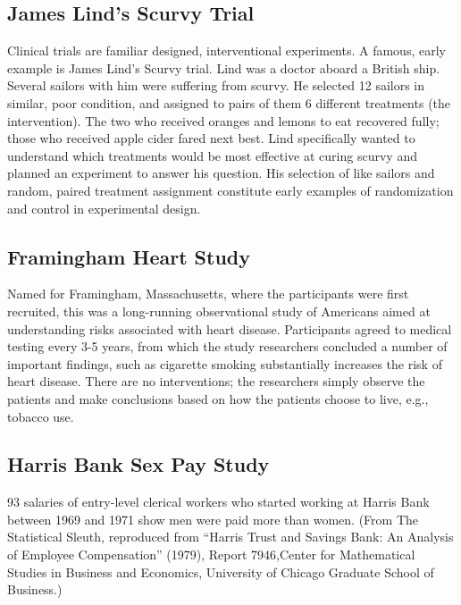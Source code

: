 \documentclass[
]{book}
\theoremstyle{definition}
\theoremstyle{definition}
\theoremstyle{definition}
\theoremstyle{definition}
\theoremstyle{remark}
\begin{document}
\hypertarget{james-linds-scurvy-trial}{%
\subsection{James Lind's Scurvy Trial}\label{james-linds-scurvy-trial}}

Clinical trials are familiar designed, interventional experiments. A famous, early example is James Lind's Scurvy trial. Lind was a doctor aboard a British ship. Several sailors with him were suffering from scurvy. He selected 12 sailors in similar, poor condition, and assigned to pairs of them 6 different treatments (the intervention). The two who received oranges and lemons to eat recovered fully; those who received apple cider fared next best. Lind specifically wanted to understand which treatments would be most effective at curing scurvy and planned an experiment to answer his question. His selection of like sailors and random, paired treatment assignment constitute early examples of randomization and control in experimental design.

\hypertarget{framingham-heart-study}{%
\subsection{Framingham Heart Study}\label{framingham-heart-study}}

Named for Framingham, Massachusetts, where the participants were first recruited, this was a long-running observational study of Americans aimed at understanding risks associated with heart disease. Participants agreed to medical testing every 3-5 years, from which the study researchers concluded a number of important findings, such as cigarette smoking substantially increases the risk of heart disease. There are no interventions; the researchers simply observe the patients and make conclusions based on how the patients choose to live, e.g., tobacco use.

\hypertarget{harris-bank-sex-pay-study}{%
\subsection{Harris Bank Sex Pay Study}\label{harris-bank-sex-pay-study}}

93 salaries of entry-level clerical workers who started working at Harris Bank between 1969 and 1971 show men were paid more than women. (From The Statistical Sleuth, reproduced from ``Harris Trust and Savings Bank: An Analysis of Employee Compensation'' (1979), Report 7946,Center for Mathematical Studies in Business and Economics, University of Chicago Graduate School of Business.)
\end{document}
